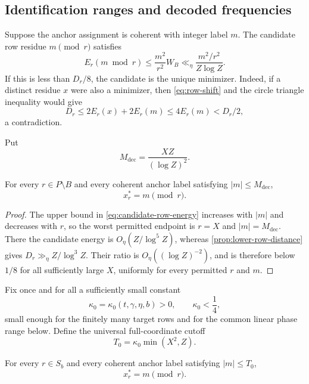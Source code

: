 \subsection{Identification ranges and decoded frequencies}

Suppose the anchor assignment is coherent with integer label $m$.  The candidate row residue $m\pmod r$ satisfies
\begin{equation}
\label{eq:candidate-row-energy}
 E_r(m\bmod r)
 \leq\frac{m^2}{r^2}W_B
 \ll_\eta\frac{m^2/r^2}{Z\log Z}.
\end{equation}
If this is less than $D_r/8$, the candidate is the unique minimizer.  Indeed, if a distinct residue $x$ were also a minimizer, then \cref{eq:row-shift} and the circle triangle inequality would give
\[
 D_r\leq2E_r(x)+2E_r(m)\leq4E_r(m)<D_r/2,
\]
a contradiction.

Put
\begin{equation}
\label{eq:M-dec}
 M_{\mathrm{dec}}=\frac{XZ}{(\log Z)^2}.
\end{equation}

\begin{proposition}
\label{prop:prime-decoder-identification}
For every $r\in P\setminus B$ and every coherent anchor label satisfying $|m|\leq M_{\mathrm{dec}}$,
\[
 x_r^*=m\pmod r.
\]
\end{proposition}

\begin{proof}
The upper bound in \cref{eq:candidate-row-energy} increases with $|m|$ and decreases with $r$, so the worst permitted endpoint is $r=X$ and $|m|=M_{\mathrm{dec}}$.  There the candidate energy is $O_\eta(Z/\log^5Z)$, whereas \cref{prop:lower-row-distance} gives $D_r\gg_\eta Z/\log^3Z$.  Their ratio is $O_\eta((\log Z)^{-2})$, and is therefore below $1/8$ for all sufficiently large $X$, uniformly for every permitted $r$ and $m$.
\end{proof}

Fix once and for all a sufficiently small constant
\[
 \kappa_0=\kappa_0(t,\gamma,\eta,b)>0,
 \qquad \kappa_0<\frac14,
\]
small enough for the finitely many target rows and for the common linear phase range below.  Define the universal full-coordinate cutoff
\begin{equation}
\label{eq:T-full}
 T_0=\kappa_0\min(X^2,Z).
\end{equation}

\begin{proposition}
\label{prop:target-decoder-identification}
For every $r\in S_b$ and every coherent anchor label satisfying $|m|\leq T_0$,
\[
 x_r^*=m\pmod r.
\]
\end{proposition}

